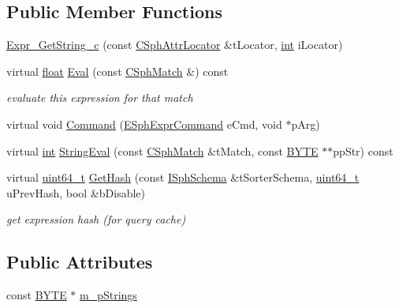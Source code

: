 \subsection*{Public Member Functions}
\begin{DoxyCompactItemize}
\item 
\hyperlink{structExpr__GetString__c_a0d02ff862bdab60b1c47c1435d286f75}{Expr\-\_\-\-Get\-String\-\_\-c} (const \hyperlink{structCSphAttrLocator}{C\-Sph\-Attr\-Locator} \&t\-Locator, \hyperlink{sphinxexpr_8cpp_a4a26e8f9cb8b736e0c4cbf4d16de985e}{int} i\-Locator)
\item 
virtual \hyperlink{sphinxexpr_8cpp_a0e0d0739f7035f18f949c2db2c6759ec}{float} \hyperlink{structExpr__GetString__c_a224a219bab5773a888ae4fffe1cf910d}{Eval} (const \hyperlink{classCSphMatch}{C\-Sph\-Match} \&) const 
\begin{DoxyCompactList}\small\item\em evaluate this expression for that match \end{DoxyCompactList}\item 
virtual void \hyperlink{structExpr__GetString__c_acb5665dd92d2613677bb5eddccf05744}{Command} (\hyperlink{sphinxexpr_8h_a30be184fb07bd80c271360fc6094c818}{E\-Sph\-Expr\-Command} e\-Cmd, void $\ast$p\-Arg)
\item 
virtual \hyperlink{sphinxexpr_8cpp_a4a26e8f9cb8b736e0c4cbf4d16de985e}{int} \hyperlink{structExpr__GetString__c_ab9acb7c35c6320efb0699ccd6e8104f3}{String\-Eval} (const \hyperlink{classCSphMatch}{C\-Sph\-Match} \&t\-Match, const \hyperlink{sphinxstd_8h_a4ae1dab0fb4b072a66584546209e7d58}{B\-Y\-T\-E} $\ast$$\ast$pp\-Str) const 
\item 
virtual \hyperlink{sphinxstd_8h_aaa5d1cd013383c889537491c3cfd9aad}{uint64\-\_\-t} \hyperlink{structExpr__GetString__c_a04f234aae9a6759cb2a2c891ad94a99f}{Get\-Hash} (const \hyperlink{classISphSchema}{I\-Sph\-Schema} \&t\-Sorter\-Schema, \hyperlink{sphinxstd_8h_aaa5d1cd013383c889537491c3cfd9aad}{uint64\-\_\-t} u\-Prev\-Hash, bool \&b\-Disable)
\begin{DoxyCompactList}\small\item\em get expression hash (for query cache) \end{DoxyCompactList}\end{DoxyCompactItemize}
\subsection*{Public Attributes}
\begin{DoxyCompactItemize}
\item 
const \hyperlink{sphinxstd_8h_a4ae1dab0fb4b072a66584546209e7d58}{B\-Y\-T\-E} $\ast$ \hyperlink{structExpr__GetString__c_a30b0444e24cf0c2c83e49d82c180d8c1}{m\-\_\-p\-Strings}
\end{DoxyCompactItemize}
